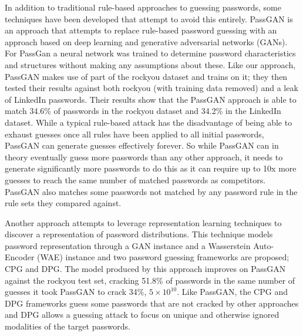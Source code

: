 \documentclass[letterpaper,twocolumn,10pt]{article}
\begin{document}
In addition to traditional rule-based approaches to guessing passwords, some techniques have
been developed that attempt to avoid this entirely.  PassGAN\cite{hitaj2019passgan} is an approach that attempts to replace rule-based
password guessing with an approach based on deep learning and generative adversarial networks (GANs).
For PassGan a neural network was trained to determine password characteristics and structures without making any
assumptions about these. Like our approach, PassGAN makes use of part of the rockyou dataset and
trains on it; they then tested their results against both rockyou (with training data removed)
and a leak of LinkedIn passwords. Their results show that the PassGAN approach is able to match 34.6\% of
passwords in the rockyou dataset and 34.2\% in the LinkedIn dataset. While a typical rule-based attack
has the disadvantage of being able to exhaust guesses once all rules have been applied to all initial
passwords, PassGAN can generate guesses effectively forever. So while PassGAN can in theory eventually
guess more passwords than any other approach, it needs to generate significantly more passwords to do
this as it can require up to 10x more guesses to reach the same number of matched passwords as
competitors. PassGAN also matches some passwords not matched by any password rule in the rule sets they
compared against.

Another approach\cite{pasquini2021improving} attempts to leverage representation learning techniques to discover a representation of
password distributions. This technique models password representation through a GAN instance and a
Wasserstein Auto-Encoder (WAE) instance and two password guessing frameworks are proposed; CPG and DPG.
The model produced by this approach improves on PassGAN against the rockyou test set, cracking 51.8\% of
passwords in the same number of guesses it took PassGAN to crack 34\%, $5 \times 10^{10}$.
Like PassGAN, the CPG and DPG frameworks guess some passwords that are not cracked by other approaches
and DPG allows a guessing attack to focus on unique and otherwise ignored modalities of the target passwords.



\end{document}
